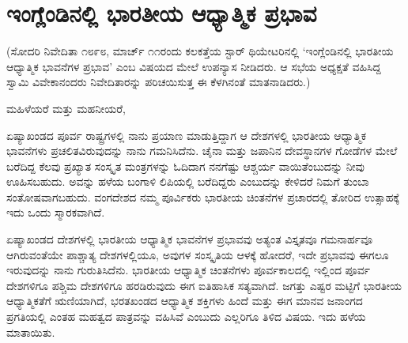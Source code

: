 
\chapter{ಇಂಗ್ಲೆಂಡಿನಲ್ಲಿ ಭಾರತೀಯ ಆಧ್ಯಾತ್ಮಿಕ ಪ್ರಭಾವ}

(ಸೋದರಿ ನಿವೇದಿತಾ ೧೮೯೮, ಮಾರ್ಚ್​ ೧೧ರಂದು ಕಲಕತ್ತೆಯ ಸ್ಟಾರ್​ ಥಿಯೇಟರಿನಲ್ಲಿ ‘ಇಂಗ್ಲೆಂಡಿನಲ್ಲಿ ಭಾರತೀಯ ಆಧ್ಯಾತ್ಮಿಕ ಭಾವನೆಗಳ ಪ್ರಭಾವ’ ಎಂಬ ವಿಷಯದ ಮೇಲೆ ಉಪನ್ಯಾಸ ನೀಡಿದರು. ಆ ಸಭೆಯ ಅಧ್ಯಕ್ಷತೆ ವಹಿಸಿದ್ದ ಸ್ವಾಮಿ ವಿವೇಕಾನಂದರು ನಿವೇದಿತಾರನ್ನು ಪರಿಚಯಿಸುತ್ತ ಈ ಕೆಳಗಿನಂತೆ ಮಾತನಾಡಿದರು.)

ಮಹಿಳೆಯರೆ ಮತ್ತು ಮಹನೀಯರೆ, 

ಏಷ್ಯಾಖಂಡದ ಪೂರ್ವ ರಾಷ್ಟ್ರಗಳಲ್ಲಿ ನಾನು ಪ್ರಯಾಣ ಮಾಡುತ್ತಿದ್ದಾಗ ಆ ದೇಶಗಳಲ್ಲಿ ಭಾರತೀಯ ಆಧ್ಯಾತ್ಮಿಕ ಭಾವನೆಗಳು ಪ್ರಚಲಿತವಿರುವುದನ್ನು ನಾನು ಗಮನಿಸಿದೆನು. ಚೈನಾ ಮತ್ತು ಜಪಾನಿನ ದೇವಸ್ಥಾನಗಳ ಗೋಡೆಗಳ ಮೇಲೆ ಬರೆದಿದ್ದ ಕೆಲವು ಪ್ರಖ್ಯಾತ ಸಂಸ್ಕೃತ ಮಂತ್ರಗಳನ್ನು ಓದಿದಾಗ ನನಗೆಷ್ಟು ಆಶ್ಚರ್ಯ ವಾಯಿತೆಂಬುದನ್ನು ನೀವು ಊಹಿಸಬಹುದು. ಅವನ್ನು ಹಳೆಯ ಬಂಗಾಳಿ ಲಿಪಿಯಲ್ಲಿ ಬರೆದಿದ್ದರು ಎಂಬುದನ್ನು ಕೇಳಿದರೆ ನಿಮಗೆ ತುಂಬಾ ಸಂತೋಷವಾಗಬಹುದು. ವಂಗದೇಶದ ನಮ್ಮ ಪೂರ್ವಿಕರು ಭಾರತೀಯ ಚಿಂತನೆಗಳ ಪ್ರಚಾರದಲ್ಲಿ ತೋರಿದ ಉತ್ಸಾಹಕ್ಕೆ ಇದು ಒಂದು ಸ್ಮಾರಕವಾಗಿದೆ. 

ಏಷ್ಯಾಖಂಡದ ದೇಶಗಳಲ್ಲಿ ಭಾರತೀಯ ಆಧ್ಯಾತ್ಮಿಕ ಭಾವನೆಗಳ ಪ್ರಭಾವವು ಅತ್ಯಂತ ವಿಸ್ತೃತವೂ ಗಮನಾರ್ಹವೂ ಆಗಿರುವಂತೆಯೇ ಪಾಶ್ಚಾತ್ಯ ದೇಶಗಳಲ್ಲಿಯೂ, ಅವುಗಳ ಸಂಸ್ಕೃತಿಯ ಆಳಕ್ಕೆ ಹೋದರೆ, ಇದೇ ಪ್ರಭಾವವು ಈಗಲೂ ಇರುವುದನ್ನು ನಾನು ಗುರುತಿಸಿದೆನು. ಭಾರತೀಯ ಆಧ್ಯಾತ್ಮಿಕ ಚಿಂತನೆಗಳು ಪೂರ್ವಕಾಲದಲ್ಲಿ ಇಲ್ಲಿಂದ ಪೂರ್ವ ದೇಶಗಳಿಗೂ ಪಶ್ಚಿಮ ದೇಶಗಳಿಗೂ ಹರಡಿರುವುದು ಈಗ ಐತಿಹಾಸಿಕ ಸತ್ಯವಾಗಿದೆ. ಜಗತ್ತು ಎಷ್ಟರ ಮಟ್ಟಿಗೆ ಭಾರತೀಯ ಆಧ್ಯಾತ್ಮಿಕತೆಗೆ ಋಣಿಯಾಗಿದೆ, ಭರತಖಂಡದ ಆಧ್ಯಾತ್ಮಿಕ ಶಕ್ತಿಗಳು ಹಿಂದೆ ಮತ್ತು ಈಗ ಮಾನವ ಜನಾಂಗದ ಪ್ರಗತಿಯಲ್ಲಿ ಎಂತಹ ಮಹತ್ವದ ಪಾತ್ರವನ್ನು ವಹಿಸಿವೆ ಎಂಬುದು ಎಲ್ಲರಿಗೂ ತಿಳಿದ ವಿಷಯ. ಇದು ಹಳೆಯ ಮಾತಾಯಿತು. 

